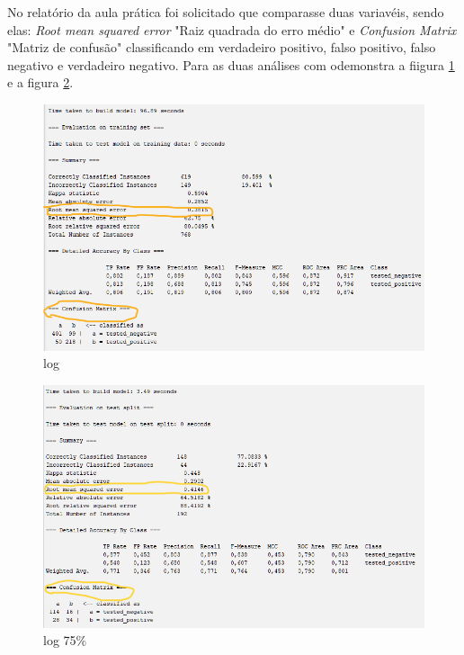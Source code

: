 \par No relatório da aula prática foi solicitado que comparasse duas variavéis, sendo elas: \textit{Root mean squared error} "Raiz quadrada do erro médio" e \textit{Confusion Matrix} "Matriz de confusão" classificando em verdadeiro positivo, falso positivo, falso negativo e verdadeiro negativo. Para as duas análises com odemonstra a fiigura \ref{fig:normal} e a figura \ref{fig:75erro}.
\begin{figure}[H]
  \center
  \includegraphics[scale=0.6]{figure/result_true3.png}
  \caption{log}\label{fig:normal}
\end{figure}

\begin{figure}[H]
  \center
  \includegraphics[scale=0.6]{figure/result_true_75p.png}
  \caption{log 75\%}\label{fig:75erro}
\end{figure}

